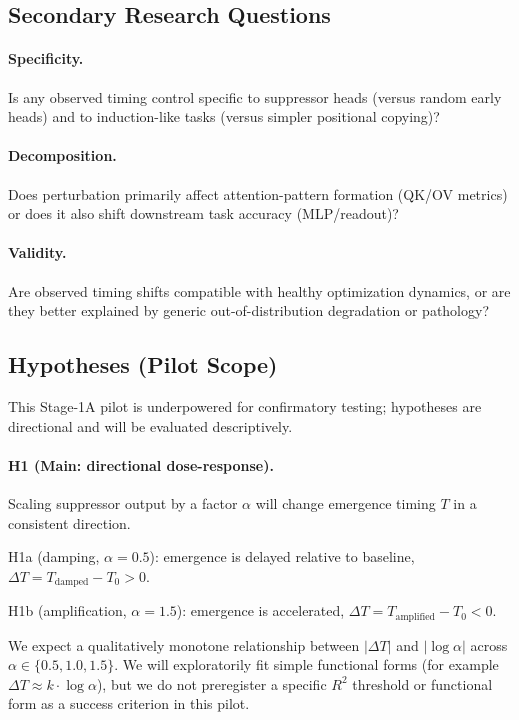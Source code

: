 \documentclass[11pt]{article}
\begin{document}
\subsection{Secondary Research Questions}

\paragraph{Specificity.}
Is any observed timing control specific to suppressor heads (versus random early heads) and to induction-like tasks (versus simpler positional copying)?

\paragraph{Decomposition.}
Does perturbation primarily affect attention-pattern formation (QK/OV metrics) or does it also shift downstream task accuracy (MLP/readout)?

\paragraph{Validity.}
Are observed timing shifts compatible with healthy optimization dynamics, or are they better explained by generic out-of-distribution degradation or pathology?

\subsection{Hypotheses (Pilot Scope)}

This Stage-1A pilot is underpowered for confirmatory testing; hypotheses are directional and will be evaluated descriptively.

\paragraph{H1 (Main: directional dose-response).}
Scaling suppressor output by a factor $\alpha$ will change emergence timing $T$ in a consistent direction.

H1a (damping, $\alpha = 0.5$): emergence is delayed relative to baseline, $\Delta T = T_{\text{damped}} - T_0 > 0$.

H1b (amplification, $\alpha = 1.5$): emergence is accelerated, $\Delta T = T_{\text{amplified}} - T_0 < 0$.

We expect a qualitatively monotone relationship between $|\Delta T|$ and $|\log \alpha|$ across $\alpha \in \{0.5, 1.0, 1.5\}$. We will exploratorily fit simple functional forms (for example $\Delta T \approx k \cdot \log \alpha$), but we do not preregister a specific $R^2$ threshold or functional form as a success criterion in this pilot.
\end{document}
